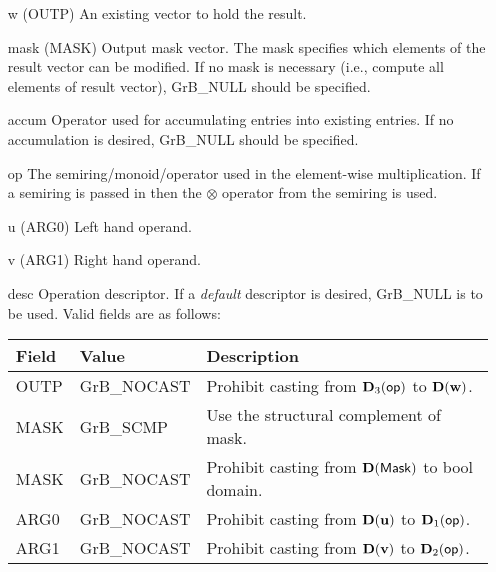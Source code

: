 \begin{itemize}[leftmargin=1.1in]
    \item[{\sf w}]     ({\sf OUTP}) An existing vector to hold the result.

    \item[{\sf mask}]  ({\sf MASK}) Output mask vector. The mask
    specifies which elements of the result vector can be modified.
    If no mask is necessary (i.e., compute all elements of result
    vector), {\sf GrB\_NULL} should be specified.

    \item[{\sf accum}]  Operator used for accumulating entries into existing
                        entries. If no accumulation is desired, 
                        {\sf GrB\_NULL} should be specified.

    \item[{\sf op}]    The semiring/monoid/operator used in the element-wise multiplication.
                       If a semiring is passed in then the $\otimes$  operator from
                                    the semiring is used.
    \item[{\sf u}]     ({\sf ARG0}) Left hand operand.
    \item[{\sf v}]     ({\sf ARG1}) Right hand operand.

    \item[{\sf desc}]  Operation descriptor. If a
    \emph{default} descriptor is desired, {\sf GrB\_NULL} is to be
    used. Valid fields are as follows: \\
    \begin{tabular}{lll}
    Field  & Value & Description \\
    \hline
    {\sf OUTP} & {\sf GrB\_NOCAST} & Prohibit casting from $\bold{D}_3({\sf op})$ to $\bold{D}({\bf w})$. \\
    {\sf MASK} & {\sf GrB\_SCMP} & Use the structural complement of {\sf mask}. \\
    {\sf MASK} & {\sf GrB\_NOCAST} & Prohibit casting from $\bold{D}({\sf Mask})$ to {\sf bool} domain. \\
    {\sf ARG0} & {\sf GrB\_NOCAST} & Prohibit casting from $\bold{D}({\bf u})$ to $\bold{D}_1({\sf op})$. \\
    {\sf ARG1} & {\sf GrB\_NOCAST} & Prohibit casting from $\bold{D}({\bf v})$ to $\bold{D}_2({\sf op})$. \\
    \end{tabular}
\end{itemize}

